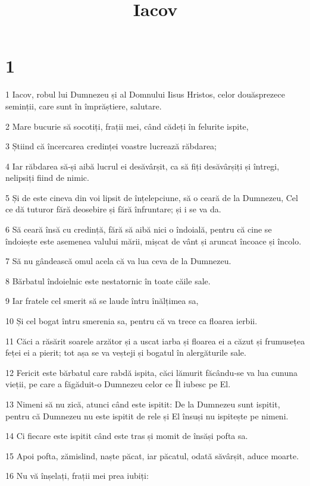 

\title{Iacov}


\chapter{1}

\par 1 Iacov, robul lui Dumnezeu și al Domnului Iisus Hristos, celor douăsprezece seminții, care sunt în împrăștiere, salutare.
\par 2 Mare bucurie să socotiți, frații mei, când cădeți în felurite ispite,
\par 3 Știind că încercarea credinței voastre lucrează răbdarea;
\par 4 Iar răbdarea să-și aibă lucrul ei desăvârșit, ca să fiți desăvârșiți și întregi, nelipsiți fiind de nimic.
\par 5 Și de este cineva din voi lipsit de înțelepciune, să o ceară de la Dumnezeu, Cel ce dă tuturor fără deosebire și fără înfruntare; și i se va da.
\par 6 Să ceară însă cu credință, fără să aibă nici o îndoială, pentru că cine se îndoiește este asemenea valului mării, mișcat de vânt și aruncat încoace și încolo.
\par 7 Să nu gândească omul acela că va lua ceva de la Dumnezeu.
\par 8 Bărbatul îndoielnic este nestatornic în toate căile sale.
\par 9 Iar fratele cel smerit să se laude întru înălțimea sa,
\par 10 Și cel bogat întru smerenia sa, pentru că va trece ca floarea ierbii.
\par 11 Căci a răsărit soarele arzător și a uscat iarba și floarea ei a căzut și frumusețea feței ei a pierit; tot așa se va veșteji și bogatul în alergăturile sale.
\par 12 Fericit este bărbatul care rabdă ispita, căci lămurit făcându-se va lua cununa vieții, pe care a făgăduit-o Dumnezeu celor ce Îl iubesc pe El.
\par 13 Nimeni să nu zică, atunci când este ispitit: De la Dumnezeu sunt ispitit, pentru că Dumnezeu nu este ispitit de rele și El însuși nu ispitește pe nimeni.
\par 14 Ci fiecare este ispitit când este tras și momit de însăși pofta sa.
\par 15 Apoi pofta, zămislind, naște păcat, iar păcatul, odată săvârșit, aduce moarte.
\par 16 Nu vă înșelați, frații mei prea iubiți:
